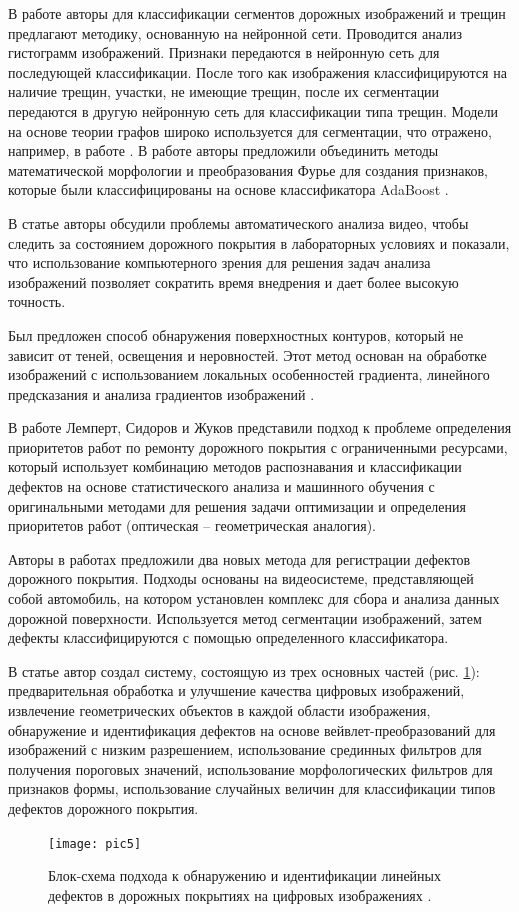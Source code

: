 \documentclass[a4paper,14pt]{extreport}
\begin{document}
В работе \cite{h69} авторы для классификации сегментов дорожных изображений и трещин предлагают методику, основанную на нейронной сети. Проводится анализ гистограмм изображений. Признаки передаются в нейронную сеть для последующей классификации. После того как изображения классифицируются на наличие трещин, участки, не имеющие трещин, после их сегментации передаются в другую нейронную сеть для классификации типа трещин. Модели на основе теории графов широко используется для сегментации, что отражено, например, в работе \cite{h70}. В работе \cite{h71} авторы предложили объединить методы математической морфологии и преобразования Фурье для создания признаков, которые были классифицированы на основе классификатора AdaBoost \cite{h72}.

В статье \cite{h73} авторы обсудили проблемы автоматического анализа видео, чтобы следить за состоянием дорожного покрытия в лабораторных условиях и показали, что использование компьютерного зрения для решения задач анализа изображений позволяет сократить время внедрения и дает более высокую точность.

Был предложен способ обнаружения поверхностных контуров, который не зависит от теней, освещения и неровностей. Этот метод основан на обработке изображений с использованием локальных особенностей градиента, линейного предсказания \cite{h74} и анализа градиентов изображений \cite{h75}. 

В работе \cite{h76} Лемперт, Сидоров и Жуков представили подход к проблеме определения приоритетов работ по ремонту дорожного покрытия с ограниченными ресурсами, который использует комбинацию методов распознавания и классификации дефектов на основе статистического анализа и машинного обучения с оригинальными методами для решения задачи оптимизации и определения приоритетов работ (оптическая – геометрическая аналогия).

Авторы в работах \cite{h77, h78} предложили два новых метода для регистрации дефектов дорожного покрытия. Подходы основаны на видеосистеме, представляющей собой автомобиль, на котором установлен комплекс для сбора и анализа данных дорожной поверхности. Используется метод сегментации изображений, затем дефекты классифицируются с помощью определенного классификатора. 

В статье \cite{ h103} автор создал систему, состоящую из трех основных частей (рис. \ref{pic5}): предварительная обработка и улучшение качества цифровых изображений, извлечение геометрических объектов в каждой области изображения, обнаружение и идентификация дефектов на основе вейвлет-преобразований для изображений с низким разрешением, использование срединных фильтров для получения пороговых значений, использование морфологических фильтров для признаков формы, использование случайных величин для классификации типов дефектов дорожного покрытия.   
\begin{figure}[ht!]
\centering
\texttt{[image: pic5]}
\caption{Блок-схема подхода к обнаружению и идентификации линейных дефектов в дорожных покрытиях на цифровых изображениях \cite{h103}.}
	\label{pic5}
	\end{figure}
\end{document}
